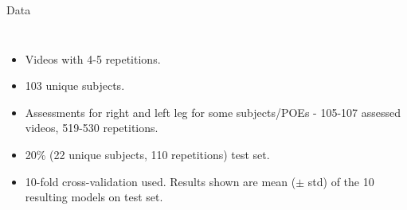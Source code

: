 \begin{frame}[fragile]{Data}
\begin{columns}[c]
    \begin{itemize}
      \small
      \item Videos with 4-5 repetitions.
      \item 103 unique subjects.
      \item Assessments for right and left leg for some subjects/POEs - 105-107 assessed videos, 519-530 repetitions.
      \item 20\% (22 unique subjects, 110 repetitions) test set.
      \item 10-fold cross-validation used. Results shown are mean ($\pm$ std) of the 10 resulting models on test set.
    \end{itemize}

  \end{columns}
\end{frame}

